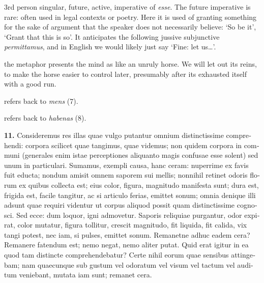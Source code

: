  3rd person singular, future, active, imperative of \textit{esse}. The future imperative is rare: often used in legal contexts or poetry. Here it is used of granting something for the sake of argument that the speaker does not necessarily believe: `So be it', `Grant that this is so'. It anticipates the following jussive subjunctive \textit{permittamus}, and in English we would likely just say `Fine: let us\dots'.

 the metaphor presents the mind as like an unruly horse. We will let out its reins, to make the horse easier to control later, presumably after its exhausted itself with a good run.

 refers back to \textit{mens} (7).

 refers back to \textit{habenas} (8).

\clearpage

\beginnumbering
\pstart
\begin{latin}
    \textenglish{\textbf{11.}} Consideremus res illas quae vulgo putantur omnium distinctissime comprehendi: corpora scilicet quae tangimus, quae videmus; non quidem corpora in communi (generales enim istae perceptiones aliquanto magis confusae esse solent) sed unum in particulari. Sumamus, exempli causa, hanc ceram: nuperrime ex favis fuit educta; nondum amisit omnem saporem sui mellis; nonnihil retinet odoris florum ex quibus collecta est; eius color, figura, magnitudo manifesta sunt; dura est, frigida est, facile tangitur, ac si articulo ferias, emittet sonum; omnia denique illi adsunt quae requiri videntur ut corpus aliquod possit quam distinctissime cognosci. Sed ecce: dum loquor, igni admovetur. Saporis reliquiae purgantur, odor expirat, color mutatur, figura tollitur, crescit magnitudo, fit liquida, fit calida, vix tangi potest, nec iam, si pulses, emittet sonum. Remanetne adhuc eadem cera? Remanere fatendum est; nemo negat, nemo aliter putat. Quid erat igitur in ea quod tam distincte comprehendebatur? Certe nihil eorum quae sensibus attingebam; nam quaecunque sub gustum vel odoratum vel visum vel tactum vel auditum veniebant, mutata iam sunt; remanet cera.
\end{latin}
\pend
\endnumbering

\prenotes

